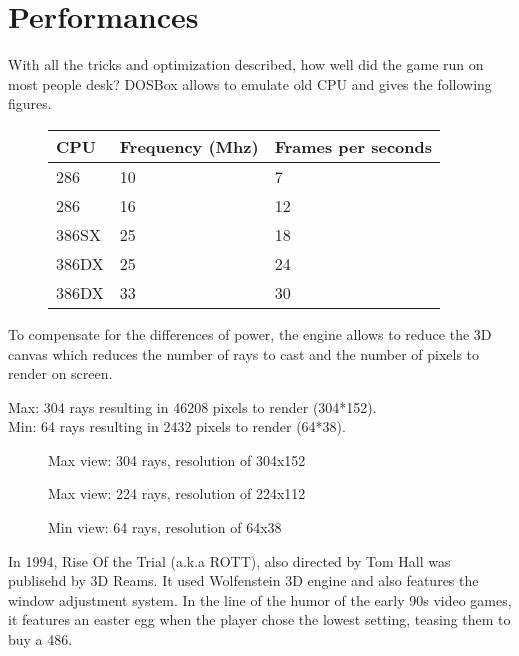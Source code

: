 \section{Performances}
With all the tricks and optimization described, how well did the game run on most people desk? DOSBox allows to emulate old CPU and gives the following figures.

\begin{figure}[H]
\centering
\begin{tabularx}{\textwidth}{ X X X }
  \toprule
  \textbf{CPU} & \textbf{Frequency (Mhz)} & \textbf{Frames per seconds} \\ \bottomrule
  286 & 10 & 7 \\
286 & 16 & 12 \\
386SX & 25 &  18 \\
386DX & 25 & 24 \\
386DX & 33 & 30 \\ \bottomrule
\end{tabularx}
\end{figure}

To compensate for the differences of power, the engine allows to reduce the 3D canvas which reduces the number of rays to cast and the number of pixels to render on screen.
\par
Max: 304 rays resulting in 46208 pixels to render (304*152).\\
Min:  64 rays resulting in 2432 pixels to render (64*38).\\

  \begin{figure}[H]
\centering
 \caption{Max view: 304 rays, resolution of 304x152}
 \end{figure}
 \par

   \begin{figure}[H]
\centering
 \caption{Max view: 224 rays, resolution of 224x112}
 \end{figure}
 \par

   \begin{figure}[H]
\centering
 \caption{Min view: 64 rays, resolution of 64x38}
 \end{figure}
 \par

In 1994, Rise Of the Trial (a.k.a ROTT), also directed by Tom Hall was publisehd by 3D Reams. It used Wolfenstein 3D engine and also features the window adjustment system. In the line of the humor of the early 90s video games, it features an easter egg when the player chose the lowest setting, teasing them to buy a 486.
    \begin{figure}[H]
\centering
 \end{figure}
 \par